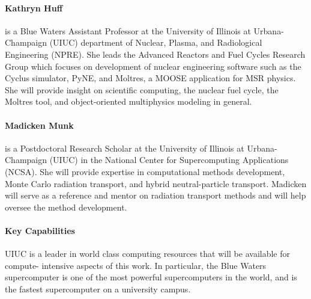 \documentclass[letterpaper,12pt]{article}
\begin{document}
\paragraph{Kathryn Huff} is a Blue Waters Assistant Professor at the University
of Illinois at Urbana-Champaign (UIUC) department of Nuclear, Plasma, and
Radiological Engineering (NPRE). She leads the Advanced Reactors and Fuel
Cycles Research Group which focuses on development of nuclear engineering
software such as the Cyclus simulator, PyNE, and Moltres, a MOOSE application
for MSR physics. She will provide insight on scientific computing, the nuclear
fuel cycle, the Moltres tool, and object-oriented multiphysics modeling in
general.

\paragraph{Madicken Munk} is a Postdoctoral Research Scholar at the University
of Illinois at Urbana-Champaign (UIUC) in the National Center for Supercomputing
Applications (NCSA). She will provide expertise in computational methods
development, Monte Carlo radiation transport, and hybrid neutral-particle
transport. Madicken will serve as a reference and mentor on radiation transport
methods and will help oversee the method development.

\paragraph{Key Capabilities}

UIUC is a leader in world class computing resources that will be available for compute-
intensive aspects of this work. In particular, the Blue Waters supercomputer is
one of the most powerful supercomputers in the world, and is the fastest
supercomputer on a university campus.


\end{document}
